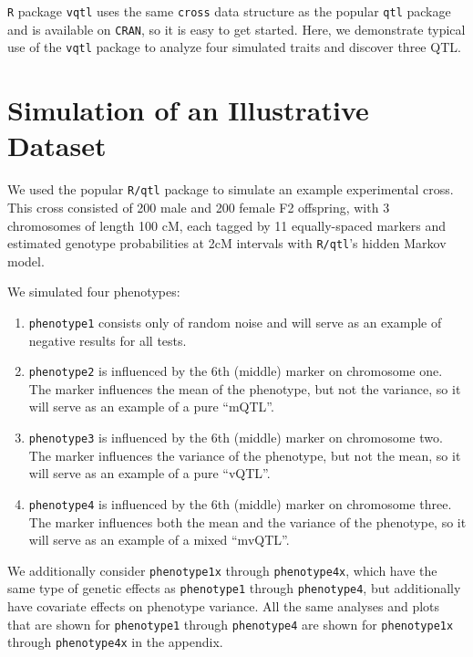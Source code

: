\documentclass[9pt,twocolumn,twoside]{gsag3jnl}
\begin{document}
\texttt{R} package \texttt{vqtl} uses the same \texttt{cross} data structure as the popular \texttt{qtl} package and is available on \texttt{CRAN}, so it is easy to get started.
Here, we demonstrate typical use of the \texttt{vqtl} package to analyze four simulated traits and discover three QTL.


\section*{Simulation of an Illustrative Dataset}

We used the popular \texttt{R/qtl} package to simulate an example experimental cross.
This cross consisted of 200 male and 200 female F2 offspring, with 3 chromosomes of length 100 cM, each tagged by 11 equally-spaced markers and estimated genotype probabilities at 2cM intervals with \texttt{R/qtl}'s hidden Markov model.

We simulated four phenotypes:

\begin{enumerate}
	\item \texttt{phenotype1} consists only of random noise and will serve as an example of negative results for all tests.
	\item \texttt{phenotype2} is influenced by the 6th (middle) marker on chromosome one.  The marker influences the mean of the phenotype, but not the variance, so it will serve as an example of a pure ``mQTL''.
	\item \texttt{phenotype3} is influenced by the 6th (middle) marker on chromosome two.  The marker influences the variance of the phenotype, but not the mean, so it will serve as an example of a pure ``vQTL''.
	\item \texttt{phenotype4} is influenced by the 6th (middle) marker on chromosome three.  The marker influences both the mean and the variance of the phenotype, so it will serve as an example of a mixed ``mvQTL''.
\end{enumerate}

We additionally consider \texttt{phenotype1x} through \texttt{phenotype4x}, which have the same type of genetic effects as \texttt{phenotype1} through \texttt{phenotype4}, but additionally have covariate effects on phenotype variance.
All the same analyses and plots that are shown for \texttt{phenotype1} through \texttt{phenotype4} are shown for \texttt{phenotype1x} through \texttt{phenotype4x} in the appendix.
\end{document}
